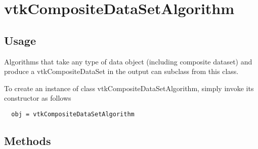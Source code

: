 \section{vtkCompositeDataSetAlgorithm}

\subsection{Usage}

 Algorithms that take any type of data object (including composite dataset)
 and produce a vtkCompositeDataSet in the output can subclass from this
 class.

To create an instance of class vtkCompositeDataSetAlgorithm, simply
invoke its constructor as follows
\begin{verbatim}
  obj = vtkCompositeDataSetAlgorithm
\end{verbatim}
\subsection{Methods}

